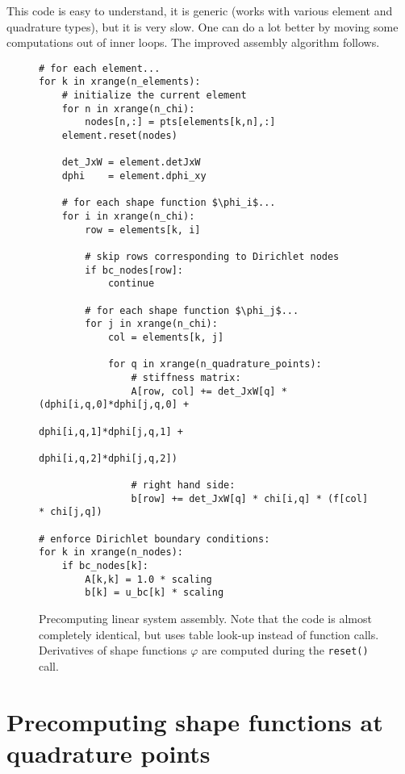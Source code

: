\documentclass{article}
\begin{document}
This code is easy to understand, it is generic (works with various element and quadrature types), but it is very slow.
One can do a lot better by moving some computations out of inner loops. The improved assembly algorithm follows.

\begin{figure}
  \centering
  \begin{lstlisting}
# for each element...
for k in xrange(n_elements):
    # initialize the current element
    for n in xrange(n_chi):
        nodes[n,:] = pts[elements[k,n],:]
    element.reset(nodes)

    det_JxW = element.detJxW
    dphi    = element.dphi_xy

    # for each shape function $\phi_i$...
    for i in xrange(n_chi):
        row = elements[k, i]

        # skip rows corresponding to Dirichlet nodes
        if bc_nodes[row]:
            continue

        # for each shape function $\phi_j$...
        for j in xrange(n_chi):
            col = elements[k, j]

            for q in xrange(n_quadrature_points):
                # stiffness matrix:
                A[row, col] += det_JxW[q] * (dphi[i,q,0]*dphi[j,q,0] +
                                             dphi[i,q,1]*dphi[j,q,1] +
                                             dphi[i,q,2]*dphi[j,q,2])

                # right hand side:
                b[row] += det_JxW[q] * chi[i,q] * (f[col]  * chi[j,q])

# enforce Dirichlet boundary conditions:
for k in xrange(n_nodes):
    if bc_nodes[k]:
        A[k,k] = 1.0 * scaling
        b[k] = u_bc[k] * scaling
  \end{lstlisting}
  \caption{Precomputing linear system assembly. Note that the code is almost completely identical, but uses table look-up instead of function calls. Derivatives of shape functions $\varphi$ are computed during the \texttt{reset()} call.}
  \label{fig:pythonbetter}
\end{figure}
\section{Precomputing shape functions at quadrature points}
\end{document}

